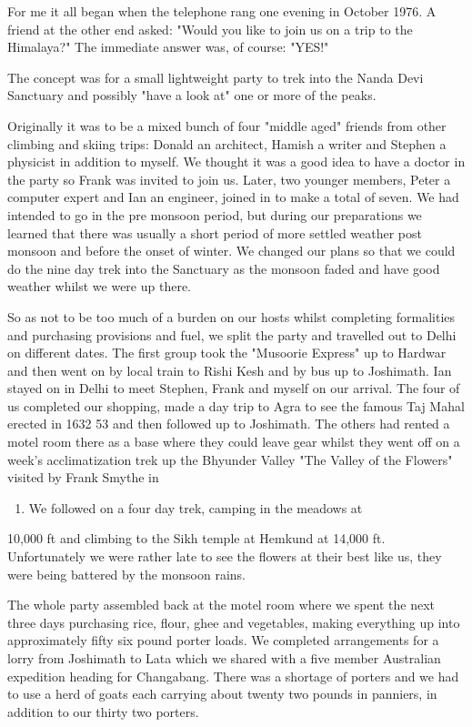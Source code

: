 \documentclass[a5paper,openany,font 10pt]{scrbook}
\begin{document}
For me it all began when the telephone rang one evening in
October 1976. A friend at the other end asked:
"Would you like to join us on a trip to the Himalaya?"
The immediate answer was, of course:
"YES!"

The concept was for a small lightweight party to trek into
the Nanda Devi Sanctuary and possibly "have a look at" one or
more of the peaks.

Originally it was to be a mixed bunch of four "middle aged"
friends from other climbing and skiing trips: Donald an
architect, Hamish a writer and Stephen a physicist in addition to
myself. We thought it was a good idea to have a doctor in the
party so Frank was invited to join us. Later, two younger
members, Peter a computer expert and Ian an engineer, joined in
to make a total of seven. We had intended to go in the pre monsoon period,
but during our preparations we learned that there
was usually a short period of more settled weather post monsoon
and before the onset of winter. We changed our plans so that we
could do the nine day trek into the Sanctuary as the monsoon
faded and have good weather whilst we were up there.

So as not to be too much of a burden on our hosts whilst
completing formalities and purchasing provisions and fuel, we
split the party and travelled out to Delhi on different dates.
The first group took the "Musoorie Express" up to Hardwar and
then went on by local train to Rishi Kesh and by bus up to
Joshimath. Ian stayed on in Delhi to meet Stephen, Frank and
myself on our arrival. The four of us completed our shopping,
made a day trip to Agra to see the famous Taj Mahal erected in
1632 53 and then followed up to Joshimath. The others had rented
a motel room  there as  a base where they could leave gear whilst
they went off on a week's acclimatization trek up the Bhyunder
Valley   "The Valley of the Flowers"   visited by Frank Smythe in
\begin{enumerate}
\item We followed on a four day trek, camping in the meadows at
\end{enumerate}
10,000 ft and climbing to the Sikh temple at Hemkund at
14,000 ft. Unfortunately we were rather late to see the flowers
at their best  like us, they were being battered by the monsoon
rains.

The whole party assembled back at the motel room where we
spent the next three days purchasing rice, flour, ghee and
vegetables, making everything up into approximately fifty six pound porter loads.
We completed arrangements for a lorry from
Joshimath to Lata which we shared with a five member Australian
expedition heading for Changabang. There was a shortage of
porters and we had to use a herd of goats  each carrying about
twenty two pounds  in panniers, in addition to our thirty two
porters.
\end{document}
